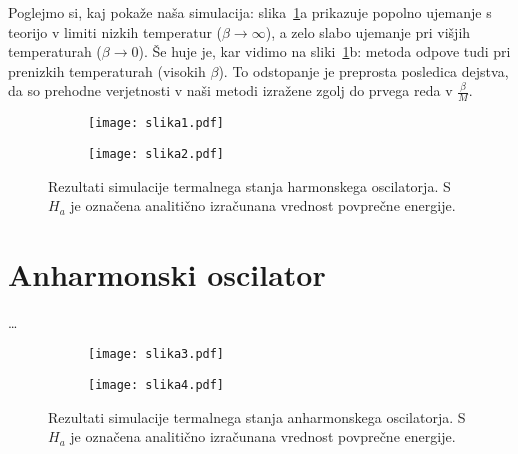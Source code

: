 \documentclass[a4paper]{article}
\begin{document}
    Poglejmo si, kaj pokaže naša simulacija: slika~\ref{slika1}a prikazuje popolno ujemanje s teorijo v limiti nizkih
    temperatur ($\beta \to \infty$), a zelo slabo ujemanje pri višjih temperaturah ($\beta \to 0$).
    Še huje je, kar vidimo na sliki~\ref{slika1}b: metoda odpove tudi pri prenizkih temperaturah (visokih $\beta$).
    To odstopanje je preprosta posledica dejstva, da so prehodne verjetnosti v naši metodi izražene zgolj do prvega
    reda v $\frac{\beta}{M}$.

    \begin{figure}
        \centering
        \begin{subfigure}{\textwidth}
            \texttt{[image: slika1.pdf]}
            \caption{}
        \end{subfigure}
        \begin{subfigure}{\textwidth}
            \texttt{[image: slika2.pdf]}
            \caption{}
        \end{subfigure}
        \caption{Rezultati simulacije termalnega stanja harmonskega oscilatorja.
        S $H_a$ je označena analitično izračunana vrednost povprečne energije.}
        \label{slika1}
    \end{figure}

    \section{Anharmonski oscilator}

    \ldots

    \begin{figure}
        \centering
        \begin{subfigure}{\textwidth}
            \texttt{[image: slika3.pdf]}
            \caption{}
        \end{subfigure}
        \begin{subfigure}{\textwidth}
            \texttt{[image: slika4.pdf]}
            \caption{}
        \end{subfigure}
        \caption{Rezultati simulacije termalnega stanja anharmonskega oscilatorja.
        S $H_a$ je označena analitično izračunana vrednost povprečne energije.}
        \label{slika2}
    \end{figure}
\end{document}
